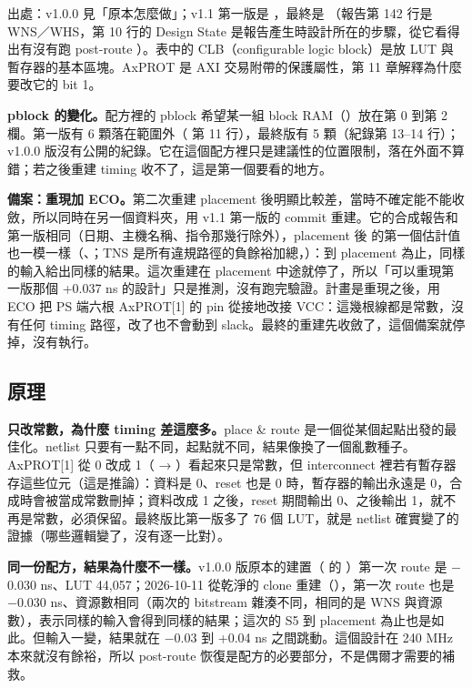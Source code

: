 出處：v1.0.0 見「原本怎麼做」；v1.1 第一版是 ，最終是 （報告第 142 行是 WNS／WHS，第 10 行的 Design State 是報告產生時設計所在的步驟，從它看得出有沒有跑 post-route ）。表中的 CLB（configurable logic block）是放 LUT 與暫存器的基本區塊。AxPROT 是 AXI 交易附帶的保護屬性，第 11 章解釋為什麼要改它的 bit 1。

\textbf{pblock 的變化。}配方裡的 pblock 希望某一組 block RAM（）放在第 0 到第 2 欄。第一版有 6 顆落在範圍外（ 第 11 行），最終版有 5 顆（紀錄第 13--14 行）；v1.0.0 版沒有公開的紀錄。它在這個配方裡只是建議性的位置限制，落在外面不算錯；若之後重建 timing 收不了，這是第一個要看的地方。

\textbf{備案：重現加 ECO。}第二次重建 placement 後明顯比較差，當時不確定能不能收斂，所以同時在另一個資料夾，用 v1.1 第一版的 commit 重建。它的合成報告和第一版相同（日期、主機名稱、指令那幾行除外），placement 後  的第一個估計值也一模一樣（、；TNS 是所有違規路徑的負餘裕加總，）：到 placement 為止，同樣的輸入給出同樣的結果。這次重建在 placement 中途就停了，所以「可以重現第一版那個 +0.037 ns 的設計」只是推測，沒有跑完驗證。計畫是重現之後，用 ECO 把 PS 端六根 AxPROT[1] 的 pin 從接地改接 VCC：這幾根線都是常數，沒有任何 timing 路徑，改了也不會動到 slack。最終的重建先收斂了，這個備案就停掉，沒有執行。

\subsection{原理}

\textbf{只改常數，為什麼 timing 差這麼多。}place \& route 是一個從某個起點出發的最佳化。netlist 只要有一點不同，起點就不同，結果像換了一個亂數種子。AxPROT[1] 從 0 改成 1（ → ）看起來只是常數，但 interconnect 裡若有暫存器存這些位元（這是推論）：資料是 0、reset 也是 0 時，暫存器的輸出永遠是 0，合成時會被當成常數刪掉；資料改成 1 之後，reset 期間輸出 0、之後輸出 1，就不再是常數，必須保留。最終版比第一版多了 76 個 LUT，就是 netlist 確實變了的證據（哪些邏輯變了，沒有逐一比對）。

\textbf{同一份配方，結果為什麼不一樣。}v1.0.0 版原本的建置（ 的 ）第一次 route 是 $-$0.030 ns、LUT 44,057；2026-10-11 從乾淨的 clone 重建（），第一次 route 也是 $-$0.030 ns、資源數相同（兩次的 bitstream 雜湊不同，相同的是 WNS 與資源數），表示同樣的輸入會得到同樣的結果；這次的 S5 到 placement 為止也是如此。但輸入一變，結果就在 $-$0.03 到 +0.04 ns 之間跳動。這個設計在 240 MHz 本來就沒有餘裕，所以 post-route 恢復是配方的必要部分，不是偶爾才需要的補救。

